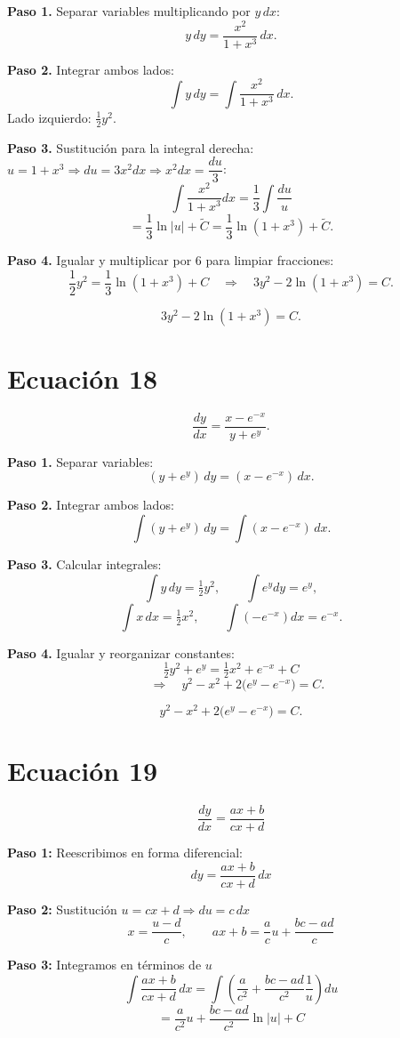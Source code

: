 \documentclass[12pt,a4paper]{article}
\begin{document}
\begin{multicols}{2}
	\textbf{Paso 1.} Separar variables multiplicando por \(y\,dx\):
	\[
	y\,dy=\frac{x^{2}}{1+x^{3}}\,dx.
	\]
	
	\textbf{Paso 2.} Integrar ambos lados:
	\[
	\int y\,dy=\int\frac{x^{2}}{1+x^{3}}\,dx.
	\]
	Lado izquierdo: \(\tfrac{1}{2}y^{2}\).
	
	\textbf{Paso 3.} Sustitución para la integral derecha: \(u=1+x^{3}\Rightarrow du=3x^{2}dx\Rightarrow x^{2}dx=\dfrac{du}{3}\):
\[
\int\frac{x^{2}}{1+x^{3}}dx=\frac{1}{3}\int\frac{du}{u}
\]
\[
=\frac{1}{3}\ln|u|+\tilde C=\frac{1}{3}\ln(1+x^{3})+\tilde C.
\]
	
	\textbf{Paso 4.} Igualar y multiplicar por 6 para limpiar fracciones:
	\[
	\frac{1}{2}y^{2}=\frac{1}{3}\ln(1+x^{3})+C
	\quad\Rightarrow\quad
	3y^{2}-2\ln(1+x^{3})=C.
	\]
	
	\[
	\boxed{3y^{2}-2\ln(1+x^{3})=C.}
	\]
	
	\section*{Ecuación 18}
	\[
	\frac{dy}{dx}=\frac{x-e^{-x}}{y+e^{y}}.
	\]
	
	\textbf{Paso 1.} Separar variables:
	\[
	(y+e^{y})\,dy=(x-e^{-x})\,dx.
	\]
	
	\textbf{Paso 2.} Integrar ambos lados:
	\[
	\int (y+e^{y})\,dy=\int (x-e^{-x})\,dx.
	\]
	
	\textbf{Paso 3.} Calcular integrales:
	\[
	\int y\,dy=\tfrac{1}{2}y^{2},\qquad \int e^{y}dy=e^{y},
	\]
	\[
	\int x\,dx=\tfrac{1}{2}x^{2},\qquad \int (-e^{-x})dx=e^{-x}.
	\]
	
	\textbf{Paso 4.} Igualar y reorganizar constantes:
	\[
	\tfrac{1}{2}y^{2}+e^{y}=\tfrac{1}{2}x^{2}+e^{-x}+C
	\]
  \[
	\quad\Rightarrow\quad
	y^{2}-x^{2}+2\bigl(e^{y}-e^{-x}\bigr)=C.\]
	
	\[
	\boxed{y^{2}-x^{2}+2\bigl(e^{y}-e^{-x}\bigr)=C.}
	\]

	
	\section*{Ecuación 19}
	\[
	\frac{dy}{dx} = \frac{a x + b}{c x + d}
	\]
	
	\textbf{Paso 1:} Reescribimos en forma diferencial:
	\[
	dy = \frac{a x + b}{c x + d}\,dx
	\]
	
	\textbf{Paso 2:} Sustitución \(u = c x + d \Rightarrow du = c\,dx\)
	\[
	x = \frac{u - d}{c}, \qquad a x + b = \frac{a}{c}u + \frac{bc - ad}{c}
	\]
	
	\textbf{Paso 3:} Integramos en términos de \(u\)
	\[
	\int \frac{a x + b}{c x + d}\,dx 
	= \int \left( \frac{a}{c^2} + \frac{bc - ad}{c^2}\frac{1}{u} \right) du
	\]
	\[
	= \frac{a}{c^2}u + \frac{bc - ad}{c^2}\ln|u| + C
	\]
	

\end{multicols}
\end{document}
